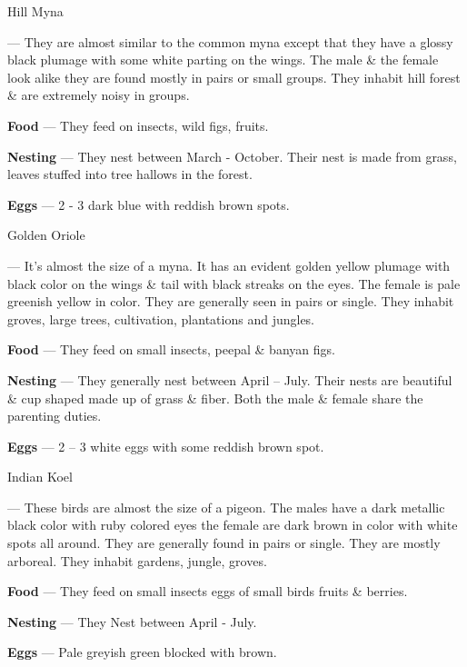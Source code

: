 \begin{bird}{Hill Myna}

 --- They are almost similar to the common myna except that they have a glossy black plumage with some white parting on the wings. The male \& the female look alike they are found mostly in pairs or small groups. They inhabit hill forest \& are extremely noisy in groups. 

{\large\bf Food} --- They feed on insects, wild figs, fruits.

{\large\bf Nesting} --- They nest between March - October. Their nest is made from grass, leaves stuffed into tree hallows in the forest.

{\large\bf Eggs} --- 2 - 3 dark blue with reddish brown spots.
\end{bird}

\begin{bird}{Golden Oriole}

 --- It's almost the size of a myna. It has an evident golden yellow plumage with black color on the wings \& tail with black streaks on the eyes. The female is pale greenish yellow in color. They are generally seen in pairs or single. They inhabit groves, large trees, cultivation, plantations and jungles.

{\large\bf Food} --- They feed on small insects, peepal \& banyan figs.

{\large\bf Nesting} --- They generally nest between April -- July. Their nests are beautiful \& cup shaped made up of grass \& fiber. Both the male \& female share the parenting duties.

{\large\bf Eggs} --- 2 -- 3 white eggs with some reddish brown spot.
\end{bird}

\begin{bird}{Indian Koel}

 --- These birds are almost the size of a pigeon. The males have a dark metallic black color with ruby colored eyes the female are dark brown in color with white spots all around. They are generally found in pairs or single. They are mostly arboreal. They inhabit gardens, jungle, groves.

{\large\bf Food} --- They feed on small insects eggs of small birds fruits \& berries. 

{\bf Nesting} --- They Nest between April - July.

{\bf Eggs} --- Pale greyish green blocked with brown.
\end{bird}

